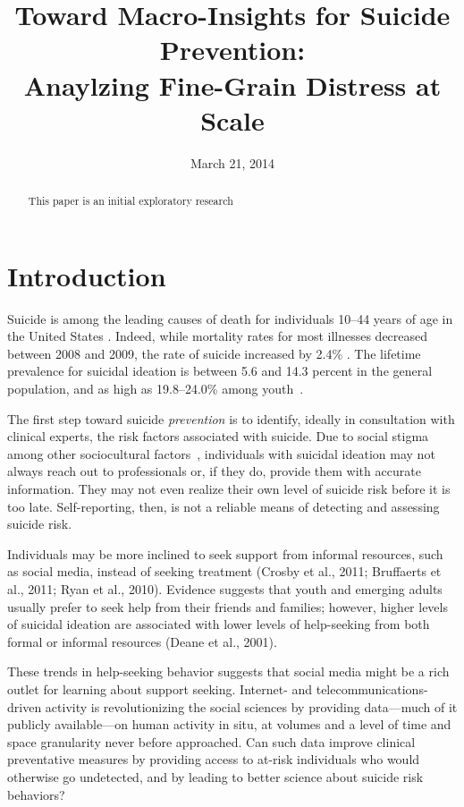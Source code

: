\documentclass[11pt]{article}
\title{Toward Macro-Insights  for Suicide Prevention: \\ Anaylzing Fine-Grain Distress at Scale}
\date{March 21, 2014}
\begin{document}
\maketitle
\begin{abstract}

This paper is an initial exploratory research 
 \end{abstract}

\section{Introduction}


Suicide is among the leading causes of death for individuals 10--44 years of age in the United States \cite{heron2009deaths}. Indeed, while mortality rates for most illnesses decreased between 2008 and 2009, the rate of suicide increased by 2.4\%  \cite{heron2009deaths}. The lifetime prevalence for suicidal ideation is between 5.6 and 14.3 percent in the general population, and as high as 19.8--24.0\% among youth~\cite{nock2008suicide}. 

The first step toward suicide \emph{prevention} is to identify, ideally in consultation with clinical experts, the risk factors associated with suicide.  Due to social stigma among other sociocultural factors~\cite{crosby2011self}, individuals with suicidal ideation may not always reach out to professionals or, if they do, provide them with accurate information. They may not even realize their own level of suicide risk before it is too late. Self-reporting, then, is not a reliable means of detecting and assessing suicide risk.

 Individuals may be more inclined to seek support from informal resources, such as social media, instead of seeking treatment (Crosby et al., 2011; Bruffaerts et al., 2011; Ryan et al., 2010). Evidence suggests that youth and emerging adults usually prefer to seek help from their friends and families; however, higher levels of suicidal ideation are associated with lower levels of help-seeking from both formal or informal resources (Deane et al., 2001).  

These trends in help-seeking behavior suggests that social media might be a rich outlet for learning about support seeking.
Internet- and telecommunications-driven activity is revolutionizing the social sciences by providing data---much of it publicly available---on human activity in situ, at volumes and a level of time and space granularity never before approached. Can such data improve clinical preventative measures by providing access to at-risk individuals who would otherwise go undetected, and by leading to better science about suicide risk behaviors? 
\end{document}
